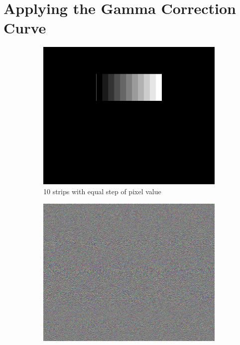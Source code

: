 \section{Applying the Gamma Correction Curve}
\begin{figure}[H]
  \centering
  \begin{subfigure}[t]{0.3\textwidth}
    \includegraphics[width=\textwidth]{10_step_original.png}
    \caption{10 strips with equal step of pixel value}\label{fig:10_step_original}
  \end{subfigure}
  \hfill
  \begin{subfigure}[t]{0.3\textwidth}
    \includegraphics[width=\textwidth]{Holo_10_step_original.png}

\end{subfigure}
\end{figure}
